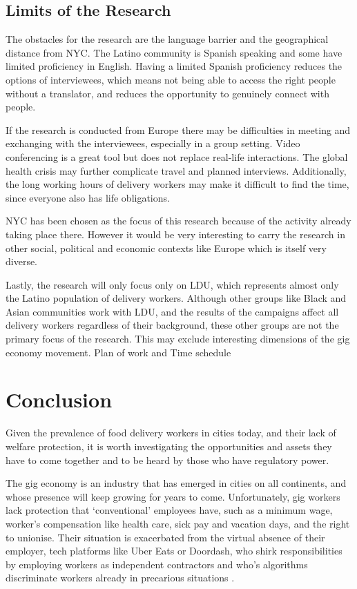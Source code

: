 \documentclass{article}
\begin{document}
\subsection{Limits of the Research}

The obstacles for the research are the language barrier and the geographical distance from NYC. The Latino community is Spanish speaking and some have limited proficiency in English. Having a limited Spanish proficiency reduces the options of interviewees, which means not being able to access the right people without a translator, and reduces the opportunity to genuinely connect with people.

If the research is conducted from Europe there may be difficulties in meeting and exchanging with the interviewees, especially in a group setting. Video conferencing is a great tool but does not replace real-life interactions. The global health crisis may further complicate travel and planned interviews. Additionally, the long working hours of delivery workers may make it difficult to find the time, since everyone also has life obligations.

NYC has been chosen as the focus of this research because of the activity already taking place there. However it would be very interesting to carry the research in other social, political and economic contexts like Europe which is itself very diverse.

Lastly, the research will only focus only on LDU, which represents almost only the Latino population of delivery workers. Although other groups like Black and Asian communities work with LDU, and the results of the campaigns affect all delivery workers regardless of their background, these other groups are not the primary focus of the research. This may exclude interesting dimensions of the gig economy movement. 
Plan of work and Time schedule

\section{Conclusion}

Given the prevalence of food delivery workers in cities today, and their lack of welfare protection, it is worth investigating the opportunities and assets they have to come together and to be heard by those who have regulatory power.

The gig economy is an industry that has emerged in cities on all continents, and whose presence will keep growing for years to come. Unfortunately, gig workers lack protection that `conventional’ employees have, such as a minimum wage, worker’s compensation like health care, sick pay and vacation days, and the right to unionise. Their situation is exacerbated from the virtual absence of their employer, tech platforms like Uber Eats or Doordash, who shirk responsibilities by employing workers as independent contractors and who’s algorithms discriminate workers already in precarious situations \parencite{kellogg2020algorithms}.
\end{document}
